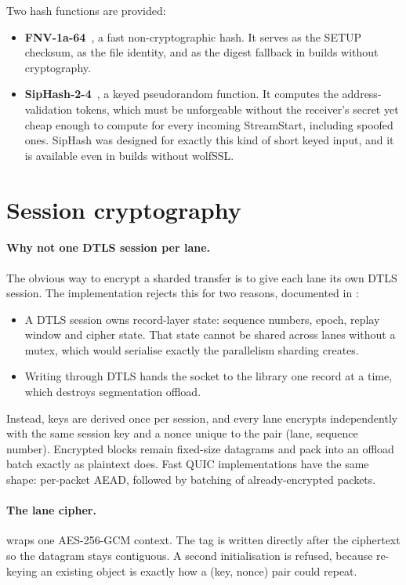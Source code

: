 Two hash functions are provided:
\begin{itemize}
  \item \textbf{FNV-1a-64}~\cite{fnv}, a fast non-cryptographic hash. It serves as the SETUP checksum, as the
    file identity, and as the digest fallback in builds without cryptography.
  \item \textbf{SipHash-2-4}~\cite{siphash}, a keyed pseudorandom function. It computes the address-validation
    tokens\vviii, which must be unforgeable without the receiver's secret yet cheap enough to compute for every
    incoming StreamStart, including spoofed ones. SipHash was designed for exactly this kind of short keyed
    input, and it is available even in builds without wolfSSL.
\end{itemize}

\section{Session cryptography}\label{sec:crypto}

\paragraph{Why not one DTLS session per lane.} The obvious way to encrypt a sharded transfer is to give each
lane its own DTLS session. The implementation rejects this for two reasons, documented in
:
\begin{itemize}
  \item A DTLS session owns record-layer state: sequence numbers, epoch, replay window and cipher state. That
    state cannot be shared across lanes without a mutex, which would serialise exactly the parallelism sharding
    creates.
  \item Writing through DTLS hands the socket to the library one record at a time, which destroys segmentation
    offload.
\end{itemize}
Instead, keys are derived once per session, and every lane encrypts independently with the same session key and
a nonce unique to the pair (lane, sequence number). Encrypted blocks remain fixed-size datagrams and pack into an
offload batch exactly as plaintext does. Fast QUIC implementations have the same shape: per-packet AEAD, followed
by batching of already-encrypted packets.

\paragraph{The lane cipher.}  wraps one AES-256-GCM context. The tag is written directly after
the ciphertext so the datagram stays contiguous. A second initialisation is refused, because re-keying an
existing object is exactly how a (key, nonce) pair could repeat.

